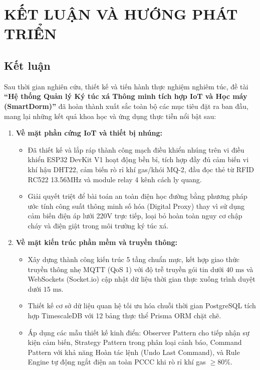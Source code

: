 \chapter{KẾT LUẬN VÀ HƯỚNG PHÁT TRIỂN}
\label{ch:chuong5}

\section{Kết luận}
\label{sec:ket_luan}

Sau thời gian nghiên cứu, thiết kế và tiến hành thực nghiệm nghiêm túc, đề tài \textbf{``Hệ thống Quản lý Ký túc xá Thông minh tích hợp IoT và Học máy (SmartDorm)''} đã hoàn thành xuất sắc toàn bộ các mục tiêu đặt ra ban đầu, mang lại những kết quả khoa học và ứng dụng thực tiễn nổi bật sau:

\begin{enumerate}
    \item \textbf{Về mặt phần cứng IoT và thiết bị nhúng:}
    \begin{itemize}
        \item Đã thiết kế và lắp ráp thành công mạch điều khiển nhúng trên vi điều khiển ESP32 DevKit V1 hoạt động bền bỉ, tích hợp đầy đủ cảm biến vi khí hậu DHT22, cảm biến rò rỉ khí gas/khói MQ-2, đầu đọc thẻ từ RFID RC522 13.56MHz và module relay 4 kênh cách ly quang.
        \item Giải quyết triệt để bài toán an toàn điện học đường bằng phương pháp ước tính công suất thông minh số hóa (Digital Proxy) thay vì sử dụng cảm biến điện áp lưới 220V trực tiếp, loại bỏ hoàn toàn nguy cơ chập cháy và điện giật trong môi trường ký túc xá.
    \end{itemize}

    \item \textbf{Về mặt kiến trúc phần mềm và truyền thông:}
    \begin{itemize}
        \item Xây dựng thành công kiến trúc 5 tầng chuẩn mực, kết hợp giao thức truyền thông nhẹ MQTT (QoS 1) với độ trễ truyền gói tin dưới $40\text{ ms}$ và WebSockets (Socket.io) cập nhật dữ liệu thời gian thực xuống trình duyệt dưới $15\text{ ms}$.
        \item Thiết kế cơ sở dữ liệu quan hệ tối ưu hóa chuỗi thời gian PostgreSQL tích hợp TimescaleDB với 12 bảng thực thể Prisma ORM chặt chẽ.
        \item Áp dụng các mẫu thiết kế kinh điển: Observer Pattern cho tiếp nhận sự kiện cảm biến, Strategy Pattern trong phân loại cảnh báo, Command Pattern với khả năng Hoàn tác lệnh (Undo Last Command), và Rule Engine tự động ngắt điện an toàn PCCC khi rò rỉ khí gas $\ge 80\%$.
    \end{itemize}


\end{enumerate}
